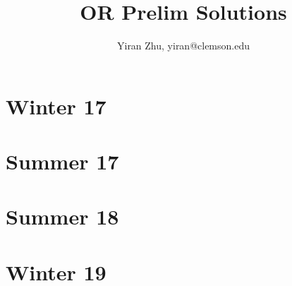 \documentclass[10.5pt]{article}
\title{OR Prelim Solutions}
\author{Yiran Zhu, yiran@clemson.edu}
\begin{document}
\maketitle

\tableofcontents
\newpage
\section{Winter 17}\label{sec:w17}

\newpage 
\section{Summer 17}\label{sec:s17}

\newpage 
\section{Summer 18}\label{sec:s18}

\newpage
\section{Winter 19}\label{sec:w19}

\end{document}

